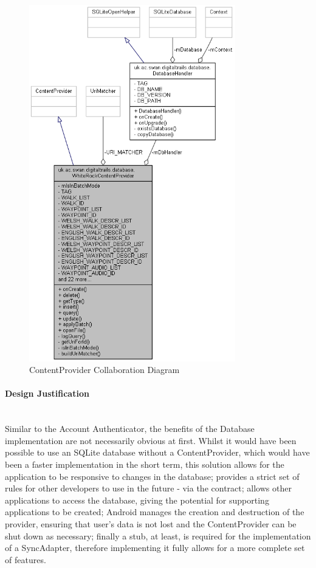 \documentclass[11pt,a4paper]{report}
\begin{document}
\begin{figure}[H]
    \centering
    \includegraphics[width=0.8\textwidth]{contentprovidercollab}
    \caption{ContentProvider Collaboration Diagram}
    \label{fig:contentprovidercollab}
\end{figure}

\paragraph*{Design Justification}\mbox{}\\ 
Similar to the Account Authenticator, the benefits of the Database implementation are not necessarily obvious at first. Whilst it would have been possible to use an SQLite database without a ContentProvider, which would have been a faster implementation in the short term, this solution allows for the application to be responsive to changes in the database; provides a strict set of rules for other developers to use in the future - via the contract; allows other applications to access the database, giving the potential for supporting applications to be created; Android manages the creation and destruction of the provider, ensuring that user's data is not lost and the ContentProvider can be shut down as necessary; finally a stub, at least, is required for the implementation of a SyncAdapter, therefore implementing it fully allows for a more complete set of features.
\end{document}

